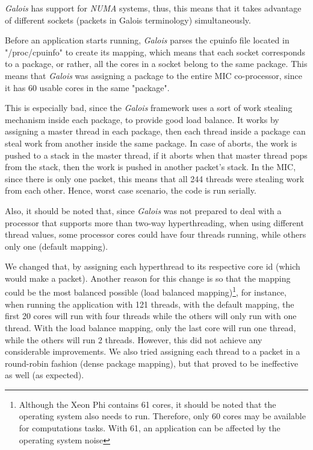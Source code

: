 \documentclass[abstract=on,9pt,twocolumn]{scrartcl}
\begin{document}
\textit{Galois} has support for \textit{NUMA} systems, thus, this means
that it takes advantage of different sockets (packets in Galois
terminology) simultaneously.

Before an application starts running, \textit{Galois} parses the cpuinfo
file located in "/proc/cpuinfo" to create its mapping, which means that
each socket corresponds to a package, or rather, all the cores in a
socket belong to the same package.  This means that \textit{Galois} was
assigning a package to the entire MIC co-processor, since it has 60
usable cores in the same "package".

This is especially bad, since the \textit{Galois} framework uses a sort
of work stealing mechanism inside each package, to provide good load
balance. It works by assigning a master thread in each package, then
each thread inside a package can steal work from another inside the same
package. In case of aborts, the work is pushed to a stack in the master
thread, if it aborts when that master thread pops from the stack, then
the work is pushed in another packet's stack. In the MIC, since there is
only one packet, this means that all 244 threads were stealing work from
each other. Hence, worst case scenario, the code is run serially. 

Also, it should be noted that, since \textit{Galois} was not prepared to
deal with a processor that supports more than two-way hyperthreading,
when using different thread values, some processor cores could have four
threads running, while others only one (default mapping).

We changed that, by assigning each hyperthread to its respective core id
(which would make a packet).  Another reason for this change is so that
the mapping could be the most balanced possible (load balanced
mapping)\footnote{Although the Xeon Phi contains 61 cores, it should be
  noted that the operating system also needs to run. Therefore, only 60
cores may be available for computations tasks. With 61, an application
can be affected by the operating system noise}, for instance, when
running the application with 121 threads, with the default mapping, the
first 20 cores will run with four threads while the others will only run
with one thread. With the load balance mapping, only the last core will
run one thread, while the others will run 2 threads. However, this did
not achieve any considerable improvements. We also tried assigning each
thread to a packet in a round-robin fashion (dense package mapping), but
that proved to be ineffective as well (as expected).
\end{document}
